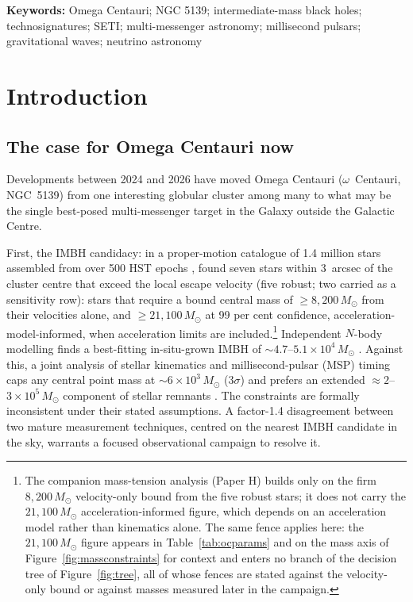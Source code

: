 \documentclass[11pt]{article}
\newcommand{\msun}{\ensuremath{M_\odot}}
\begin{document}
\begin{abstract}
advances without confirmation from at least two independent messengers; under realistic outcomes the campaign adjudicates the astrophysical hypotheses, while the technosignature hypothesis is constrained only along specific low-probability branches.
\end{abstract}

\bigskip
\noindent\textbf{Keywords:} Omega Centauri; NGC 5139; intermediate-mass black holes; technosignatures; SETI; multi-messenger astronomy; millisecond pulsars; gravitational waves; neutrino astronomy

\newpage
\tableofcontents
\newpage

\section{Introduction}
\label{sec:intro}

\subsection{The case for Omega Centauri now}

Developments between 2024 and 2026 have moved Omega Centauri ($\omega$~Centauri, NGC~5139) from one interesting globular cluster among many to what may be the single best-posed multi-messenger target in the Galaxy outside the Galactic Centre.

First, the IMBH candidacy: in a proper-motion catalogue of 1.4 million stars assembled from over 500 HST epochs \citep{Haberle2024oMEGACatII}, \citet{Haberle2024Nature} found seven stars within 3~arcsec of the cluster centre that exceed the local escape velocity (five robust; two carried as a sensitivity row): stars that require a bound central mass of $\geq 8{,}200\,\msun$ from their velocities alone, and $\geq 21{,}100\,\msun$ at 99 per cent confidence, acceleration-model-informed, when acceleration limits are included.\footnote{The companion mass-tension analysis (Paper H) builds only on the firm $8{,}200\,\msun$ velocity-only bound from the five robust stars; it does not carry the $21{,}100\,\msun$ acceleration-informed figure, which depends on an acceleration model rather than kinematics alone. The same fence applies here: the $21{,}100\,\msun$ figure appears in Table~\ref{tab:ocparams} and on the mass axis of Figure~\ref{fig:massconstraints} for context and enters no branch of the decision tree of Figure~\ref{fig:tree}, all of whose fences are stated against the velocity-only bound or against masses measured later in the campaign.} Independent $N$-body modelling finds a best-fitting in-situ-grown IMBH of $\sim 4.7$--$5.1\times 10^{4}\,\msun$ \citep{GonzalezPrieto2025}. Against this, a joint analysis of stellar kinematics and millisecond-pulsar (MSP) timing caps any central point mass at $\sim 6\times 10^{3}\,\msun$ ($3\sigma$) and prefers an extended $\approx 2$--$3\times10^{5}\,\msun$ component of stellar remnants \citep{BanaresHernandez2025}. The constraints are formally inconsistent under their stated assumptions. A factor-1.4 disagreement between two mature measurement techniques, centred on the nearest IMBH candidate in the sky, warrants a focused observational campaign to resolve it.
\end{document}
